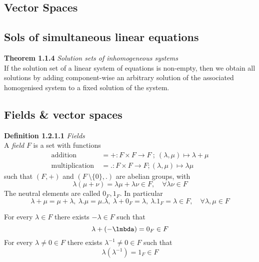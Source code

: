 \documentclass[8pt,landscape]{article}
\begin{document}
\begin{multicols}{3}
    \setlength{\premulticols}{1pt}
    \setlength{\postmulticols}{1pt}
    \setlength{\multicolsep}{1pt}
    \setlength{\columnsep}{1pt}

    \section{Vector Spaces}

    \subsection{Sols of simultaneous linear equations}

    \textbf{Theorem 1.1.4} \emph{Solution sets of inhomogeneous systems } \\
    If the solution set of a linear system of equations is non-empty,
    then we obtain all solutions by adding component-wise an arbitrary solution
    of the associated homogenised system to a fixed solution of the system.

    \subsection{Fields \& vector spaces}

    \item \textbf{Definition 1.2.1.1} \emph{Fields} \\
        A \emph{field} $F$ is a set with functions
        \begin{align*}{}
            \text{addition} \  &= + : F \times F \to F \ ;
            \ (\lambda, \mu) \mapsto \lambda + \mu \\
            \text{multiplication} \ &=. : F \times F \to F ; (\lambda, \mu)
            \mapsto \lambda\mu
        \end{align*}
        such that $(F, +)$ and $(F \ \setminus \{0\},.)$ are abelian groups, with
        \[
            \lambda (\mu + \nu) = \lambda \mu + \lambda \nu \in F, \quad
            \forall \lambda \nu \in F
        \]
        The neutral elements are called $0_F, 1_F$.
        In particular
        \[
            \lambda + \mu = \mu + \lambda ,\
            \lambda. \mu  = \mu. \lambda ,\
            \lambda + 0_F = \lambda ,\
            \lambda. 1_F  = \lambda \in F, \quad
            \forall \lambda, \mu \in F
        \]

        For every $\lambda \in F$ there exists $-\lambda \in F$ such that
        \[
            \lambda + (-\lmbda) = 0_F \in F
        \]
        For every $\lambda \neq 0 \in F$ there exists $\lambda^{-1} \neq 0 \in F$ such that
        \[
            \lambda(\lambda^{-1}) = 1_F \in F
        \]


\end{multicols}
\end{document}
